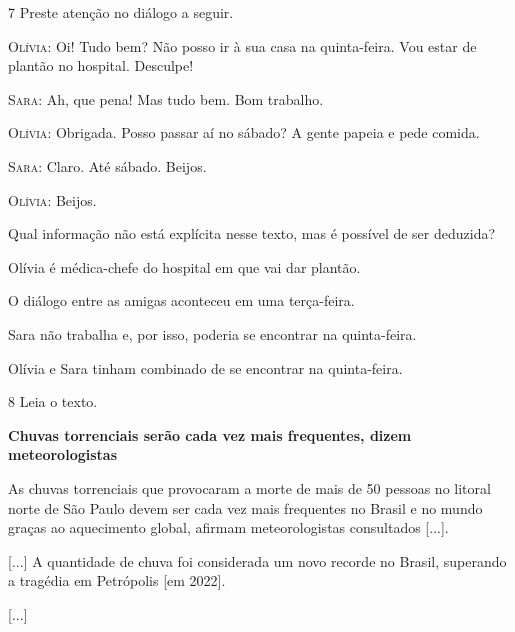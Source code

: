 \num{7} Preste atenção no diálogo a seguir.

\begin{myquote}
\textsc{ }

\textsc{Olívia}: Oi! Tudo bem? Não posso ir à sua casa na quinta-feira. Vou estar de plantão
no hospital. Desculpe!

\textsc{Sara}: Ah, que pena! Mas tudo bem. Bom trabalho.

\textsc{Olívia}: Obrigada. Posso passar aí no sábado? A gente papeia e pede comida.

\textsc{Sara}: Claro. Até sábado. Beijos.

\textsc{Olívia}: Beijos.

\end{myquote}

Qual informação não está explícita nesse texto, mas é possível de ser
deduzida?

\begin{escolha}
\item Olívia é médica-chefe do hospital em que vai dar plantão.

\item O diálogo entre as amigas aconteceu em uma terça-feira.

\item Sara não trabalha e, por isso, poderia se encontrar na quinta-feira.

\item Olívia e Sara tinham combinado de se encontrar na quinta-feira.
\end{escolha}


\num{8} Leia o texto.

\begin{myquote}
\textbf{Chuvas torrenciais serão cada vez mais frequentes, dizem
meteorologistas}

As chuvas torrenciais que provocaram a morte de mais de 50 pessoas no
litoral norte de São Paulo devem ser cada vez mais frequentes no Brasil
e no mundo graças ao aquecimento global, afirmam meteorologistas
consultados {[}...{]}.

{[}...{]} A quantidade de chuva foi considerada um novo recorde no
Brasil, superando a tragédia em Petrópolis {[}em 2022{]}.

{[}...{]}

\end{myquote}

